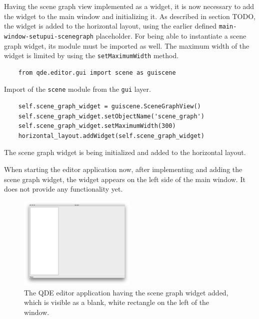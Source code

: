 \documentclass[10pt, openright, notitlepage]{scrreprt}
\begin{document}
Having the scene graph view implemented as a widget, it is now necessary to add
the widget to the main window and initializing it. As described in section
TODO, the widget is added to the horizontal layout, using the earlier defined
\texttt{main-window-setupui-scenegraph} placeholder. For being able to
instantiate a scene graph widget, its module must be imported as well. The
maximum width of the widget is limited by using the \texttt{setMaximumWidth}
method.

\begin{listing}[H]
\begin{verbatim}
    from qde.editor.gui import scene as guiscene
\end{verbatim}
\caption{\label{main-window-project-imports}
Import of the \texttt{scene} module from the \texttt{gui} layer.}
\end{listing}

\begin{listing}[H]
\begin{verbatim}
    self.scene_graph_widget = guiscene.SceneGraphView()
    self.scene_graph_widget.setObjectName('scene_graph')
    self.scene_graph_widget.setMaximumWidth(300)
    horizontal_layout.addWidget(self.scene_graph_widget)
\end{verbatim}
\caption{\label{main-window-setupui-scenegraph}
The scene graph widget is being initialized and added to the horizontal layout.}
\end{listing}

When starting the editor application now, after implementing and adding the
scene graph widget, the widget appears on the left side of the main window. It
does not provide any functionality yet.

\begin{figure}[H]
\centering
\includegraphics[width=0.5\textwidth]{./images/qde_alpha_02.png}
\caption{\label{fig:editor-alpha-02}
The QDE editor application having the scene graph widget added, which is visible as a blank, white rectangle on the left of the window.}
\end{figure}
\end{document}

